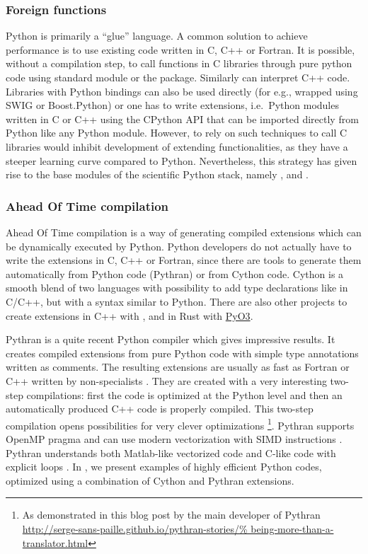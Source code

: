 \subsubsection{Foreign functions}
%
Python is primarily a ``glue'' language. A common solution to achieve
performance is to use existing code written in C, C++ or Fortran.
%
It is possible, without a compilation step, to call functions in C libraries
through pure python code using  standard module or the 
package.
%
Similarly \href{https://cppyy.readthedocs.io}{} can interpret C++
code. Libraries with Python bindings can also be used directly (for e.g.,
wrapped using SWIG or Boost.Python) or one has to write extensions, i.e.\
Python modules written in C or C++ using the CPython API that can be imported
directly from Python like any Python module.
%
However, to rely on such techniques to call C libraries would inhibit
development of extending functionalities, as they have a steeper learning curve
compared to Python.
%
Nevertheless, this strategy has given rise to the base modules of the
scientific Python stack, namely \Numpy, \Scipy and \pack{Matplotlib}.

\subsubsection{Ahead Of Time compilation}
Ahead Of Time compilation is a way of generating compiled extensions which
can be dynamically executed by Python.
%
Python developers do not actually have to write the extensions in C, C++ or
Fortran, since there are tools to generate them automatically from Python code
(Pythran) or from Cython code. Cython \citep{behnel_cython2011} is a smooth
blend of two languages with possibility to add type declarations like in C/C++,
but with a syntax similar to Python.
%
There are also other projects to create extensions in C++ with ,
and in Rust with \href{https:///pyo3.rs}{PyO3}.


Pythran \citep{guelton2015pythran, guelton2018pythran} is a quite recent Python
compiler which gives impressive results. It creates compiled extensions from pure
Python code with simple type annotations written as comments.
%
The resulting extensions are usually as fast as Fortran or C++ written by
non-specialists \citep[see, for example, benchmarks for the packages
\fluidpack{fft} and \fluidpack{sim},][]{fluidfft, fluidsim}.
%
They are created with a very interesting two-step compilations: first the code
is optimized at the Python level and then an automatically produced C++ code is
properly compiled.
%
This two-step compilation opens possibilities for very clever optimizations%
\footnote{As demonstrated in this blog post by the main developer of
Pythran \url{http://serge-sans-paille.github.io/pythran-stories/%
being-more-than-a-translator.html}}.
%
Pythran supports OpenMP pragma \citep{guelton2013compiling} and can use modern
vectorization with SIMD instructions \citep{guelton2014exploring}. Pythran
understands both Matlab-like vectorized code and C-like code with explicit loops
\citep{guelton2018pythran}.
%
In \citet{fluidfft, fluidsim}, we present examples of
highly efficient Python codes, optimized using a combination of Cython and
Pythran extensions.

